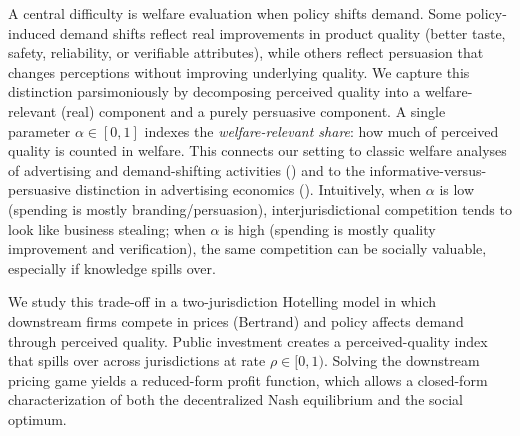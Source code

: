 \documentclass[sn-mathphys-ay]{sn-jnl} %
\theoremstyle{remark}
\begin{document}
A central difficulty is welfare evaluation when policy shifts demand.
Some policy-induced demand shifts reflect real improvements in product quality (better taste, safety, reliability, or verifiable attributes), while others reflect persuasion that changes perceptions without improving underlying quality.
We capture this distinction parsimoniously by decomposing perceived quality into a welfare-relevant (real) component and a purely persuasive component.
A single parameter $\alpha\in[0,1]$ indexes the \emph{welfare-relevant share}: how much of perceived quality is counted in welfare.
This connects our setting to classic welfare analyses of advertising and demand-shifting activities (\citealp{DorfmanSteiner1954,DixitNorman1978}) and to the informative-versus-persuasive distinction in advertising economics (\citealp{Nelson1974,GrossmanShapiro1984,BeckerMurphy1993,Ackerberg2001,BlochManceau1999}).
Intuitively, when $\alpha$ is low (spending is mostly branding/persuasion), interjurisdictional competition tends to look like business stealing; when $\alpha$ is high (spending is mostly quality improvement and verification), the same competition can be socially valuable, especially if knowledge spills over.

We study this trade-off in a two-jurisdiction Hotelling model in which downstream firms compete in prices (Bertrand) and policy affects demand through perceived quality.
Public investment creates a perceived-quality index that spills over across jurisdictions at rate $\rho\in[0,1)$.
Solving the downstream pricing game yields a reduced-form profit function, which allows a closed-form characterization of both the decentralized Nash equilibrium and the social optimum.
\end{document}
